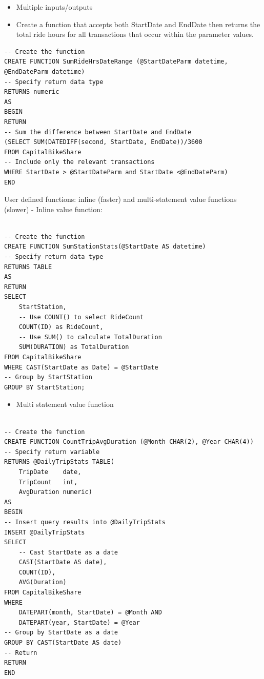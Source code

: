 \documentclass[]{book}
\providecommand{\tightlist}{%
  \setlength{\itemsep}{0pt}\setlength{\parskip}{0pt}}
\begin{document}
\begin{itemize}
\tightlist
\item
  Multiple inputs/outputs
\item
  Create a function that accepts both StartDate and EndDate then returns the total ride hours for all transactions that occur within the parameter values.
\end{itemize}

\begin{verbatim}
-- Create the function
CREATE FUNCTION SumRideHrsDateRange (@StartDateParm datetime, @EndDateParm datetime)
-- Specify return data type
RETURNS numeric
AS
BEGIN
RETURN
-- Sum the difference between StartDate and EndDate
(SELECT SUM(DATEDIFF(second, StartDate, EndDate))/3600
FROM CapitalBikeShare
-- Include only the relevant transactions
WHERE StartDate > @StartDateParm and StartDate <@EndDateParm)
END
\end{verbatim}

User defined functions: inline (faster) and multi-statement value functions (slower)
- Inline value function:

\begin{verbatim}

-- Create the function
CREATE FUNCTION SumStationStats(@StartDate AS datetime)
-- Specify return data type
RETURNS TABLE
AS
RETURN
SELECT
	StartStation,
    -- Use COUNT() to select RideCount
	COUNT(ID) as RideCount,
    -- Use SUM() to calculate TotalDuration
    SUM(DURATION) as TotalDuration
FROM CapitalBikeShare
WHERE CAST(StartDate as Date) = @StartDate
-- Group by StartStation
GROUP BY StartStation;
\end{verbatim}

\begin{itemize}
\tightlist
\item
  Multi statement value function
\end{itemize}

\begin{verbatim}

-- Create the function
CREATE FUNCTION CountTripAvgDuration (@Month CHAR(2), @Year CHAR(4))
-- Specify return variable
RETURNS @DailyTripStats TABLE(
	TripDate	date,
	TripCount	int,
	AvgDuration	numeric)
AS
BEGIN
-- Insert query results into @DailyTripStats
INSERT @DailyTripStats
SELECT
    -- Cast StartDate as a date
	CAST(StartDate AS date),
    COUNT(ID),
    AVG(Duration)
FROM CapitalBikeShare
WHERE
	DATEPART(month, StartDate) = @Month AND
    DATEPART(year, StartDate) = @Year
-- Group by StartDate as a date
GROUP BY CAST(StartDate AS date)
-- Return
RETURN
END
\end{verbatim}
\end{document}

